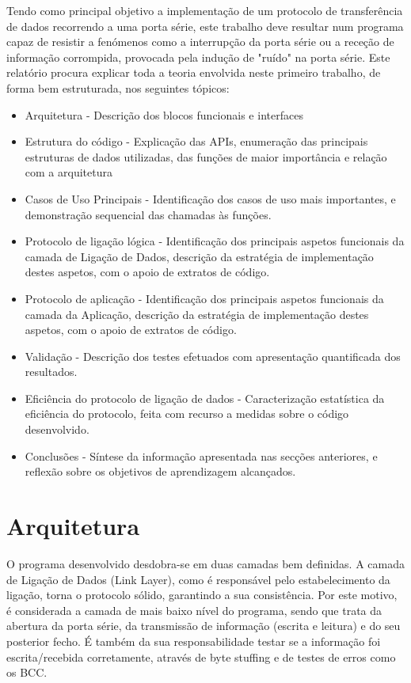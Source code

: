 \documentclass[article, a4paper, 11pt, oneside]{memoir}
\begin{document}
Tendo como principal objetivo a implementação de um protocolo de transferência de dados recorrendo a uma porta série, 
este trabalho deve resultar num programa capaz de resistir a fenómenos como a interrupção da porta série ou a receção de informação corrompida,
provocada pela indução de "ruído" na porta série. Este relatório procura explicar toda a teoria envolvida neste primeiro trabalho, de forma bem estruturada, 
nos seguintes tópicos:
\begin{itemize}
	\item Arquitetura - Descrição dos blocos funcionais e interfaces
	\item Estrutura do código - Explicação das APIs, enumeração das principais estruturas de dados utilizadas, das funções de maior importância e relação com a arquitetura
	\item Casos de Uso Principais - Identificação dos casos de uso mais importantes, e demonstração sequencial das chamadas às funções.
	\item Protocolo de ligação lógica - Identificação dos principais aspetos funcionais da camada de Ligação de Dados, descrição da estratégia de implementação destes aspetos, com o apoio de extratos de código.
	\item Protocolo de aplicação - Identificação dos principais aspetos funcionais da camada da Aplicação, descrição da estratégia de implementação destes aspetos, com o apoio de extratos de código.
	\item Validação - Descrição dos testes efetuados com apresentação quantificada dos resultados.
	\item Eficiência do protocolo de ligação de dados - Caracterização estatística da eficiência do protocolo, feita com recurso a medidas sobre o código desenvolvido.
	\item Conclusões - Síntese da informação apresentada nas secções anteriores, e reflexão sobre os objetivos de aprendizagem alcançados.
\end{itemize}

\chapter[Arquitetura][Arquitetura]{Arquitetura} \label{\thechapter}

O programa desenvolvido desdobra-se em duas camadas bem definidas. A camada de Ligação de Dados (Link Layer), como é responsável 
pelo estabelecimento da ligação, 
torna o protocolo sólido, garantindo a sua consistência. 
Por este motivo, é considerada a camada de mais baixo nível do programa, sendo que trata da abertura da porta série, 
da transmissão de informação (escrita e leitura) e do seu posterior fecho. 
É também da sua responsabilidade testar se a informação foi escrita/recebida corretamente, através de byte stuffing e de testes de erros como os BCC.
\end{document}
